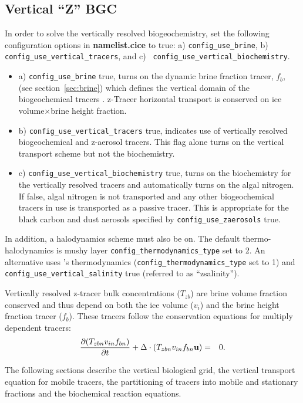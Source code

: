 \subsection{Vertical ``Z'' BGC}
\label{sec:zbgc}
In order to solve the vertically resolved biogeochemistry, set the
following configuration options in {\bf namelist.cice} to true: a)
{\tt config\_use\_brine}, b) {\tt config\_use\_vertical\_tracers}, and
\newline c) {\tt
  config\_use\_vertical\_biochemistry}.
\begin{itemize}
\item a) {\tt config\_use\_brine} true, turns on the dynamic brine
  fraction tracer, $f_b$, (see section~\ref{sec:brine}) which defines the vertical domain of the
  biogeochemical tracers .  z-Tracer horizontal transport is conserved on ice
  volume$\times$brine height fraction.
\item b) {\tt config\_use\_vertical\_tracers} true, indicates use of vertically resolved
  biogeochemical and z-aerosol tracers.  This flag alone turns on the
  vertical transport scheme but not the biochemistry.
\item c) {\tt config\_use\_vertical\_biochemistry} true, turns on the biochemistry for the
  vertically resolved tracers and automatically turns on the algal
  nitrogen. If false, algal nitrogen is not transported and any other biogeochemical tracers in use is
  transported as a passive tracer.  This is appropriate for the black
  carbon and dust aerosols specified by {\tt config\_use\_zaerosols} true.
\end{itemize}
In addition, a halodynamics scheme must also be on.  The default
thermo-halodynamics is mushy layer {\tt config\_thermodynamics\_type} set to 2.  An
alternative uses \cite{BL99}'s thermodynamics ({\tt config\_thermodynamics\_type} set
to 1) and {\tt config\_use\_vertical\_salinity} true (referred to as ``zsalinity'').

Vertically resolved z-tracer bulk concentrations ($T_{zb}$) are  brine volume fraction conserved and thus
depend on both the ice volume ($v_{i}$) and the brine height fraction tracer ($f_b$).   These tracers follow the conservation equations for multiply dependent
tracers:
\begin{eqnarray}
\label{eqn:zbgc_tracer_thickness_cons}
\frac{\partial (T_{zbn} v_{in}f_{bn})}{\partial t} + \Delta \cdot (T_{zbn} v_{in}f_{bn} {\bf u}) & = & 0.
\end{eqnarray}

The following sections describe the vertical biological grid, the
vertical transport equation for mobile tracers, the partitioning of
tracers into  mobile and stationary fractions and the
biochemical reaction equations.
